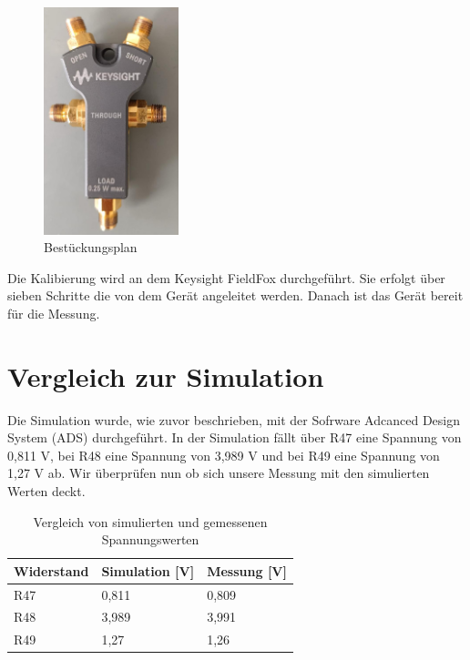 \begin{figure}[h]
    \centering
    \includegraphics[width=0.35\textwidth]{Pictures/Keysightkallibrierung.jpg}
    \caption{Bestückungsplan}
\end{figure}
Die Kalibierung wird an dem Keysight FieldFox durchgeführt. Sie erfolgt über sieben Schritte die von dem Gerät 
angeleitet werden. Danach ist das Gerät bereit für die Messung.

\section{Vergleich zur Simulation}
Die Simulation wurde, wie zuvor beschrieben, mit der Sofrware Adcanced Design System (ADS) durchgeführt. In der Simulation fällt über R47 eine Spannung
von 0,811 V, bei R48 eine Spannung von 3,989 V und bei R49 eine Spannung von 1,27 V ab. Wir überprüfen nun ob sich unsere Messung mit den simulierten Werten
deckt.
\\

\begin{table}[h]
    \centering
    \begin{tabular}{|l|l|l|}
        \hline
        \textbf{Widerstand} & \textbf{Simulation [V]} & \textbf{Messung [V]} \\
        \hline
        R47 & 0{,}811 & 0{,}809 \\
        \hline
        R48 & 3{,}989 & 3{,}991 \\
        \hline
        R49 & 1{,}27  & 1{,}26 \\
        \hline
    \end{tabular}
    \caption{Vergleich von simulierten und gemessenen Spannungswerten}
\end{table}

\clearpage
